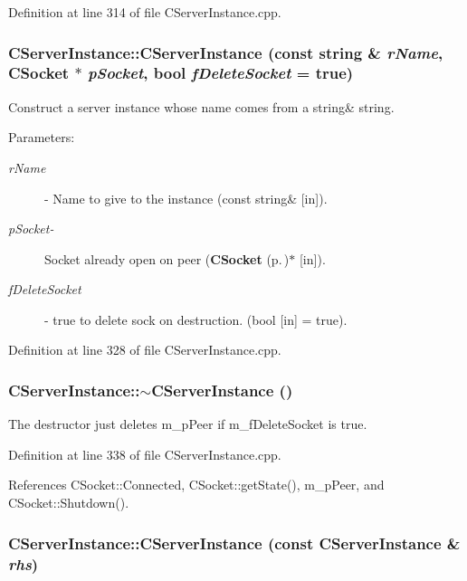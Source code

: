 Definition at line 314 of file CServer\-Instance.cpp.
\subsubsection{\setlength{\rightskip}{0pt plus 5cm}CServer\-Instance::CServer\-Instance (const string \& {\em r\-Name}, {\bf CSocket} $\ast$ {\em p\-Socket}, bool {\em f\-Delete\-Socket} = true)}\label{classCServerInstance_a2}


Construct a server instance whose name comes from a string\& string.\begin{Desc}
\item[Parameters: ]\par
\begin{description}
\item[{\em 
r\-Name}]- Name to give to the instance (const string\& [in]). \item[{\em 
p\-Socket-}]Socket already open on peer ({\bf CSocket} {\rm (p.\,\pageref{classCSocket})}$\ast$ [in]). \item[{\em 
f\-Delete\-Socket}]- true to delete sock on destruction. (bool [in] = true). \end{description}
\end{Desc}


Definition at line 328 of file CServer\-Instance.cpp.
\subsubsection{\setlength{\rightskip}{0pt plus 5cm}CServer\-Instance::$\sim$CServer\-Instance ()}\label{classCServerInstance_a3}


The destructor just deletes m\_\-p\-Peer if m\_\-f\-Delete\-Socket is true. 

Definition at line 338 of file CServer\-Instance.cpp.

References CSocket::Connected, CSocket::get\-State(), m\_\-p\-Peer, and CSocket::Shutdown().
\subsubsection{\setlength{\rightskip}{0pt plus 5cm}CServer\-Instance::CServer\-Instance (const CServer\-Instance \& {\em rhs})\hspace{0.3cm}{\tt  [private]}}\label{classCServerInstance_c0}




